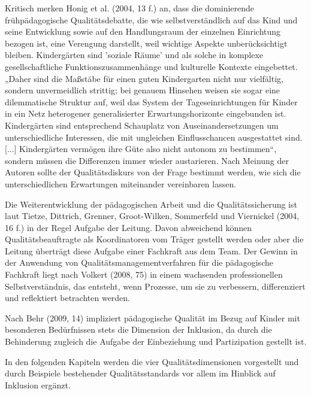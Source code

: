 Kritisch merken Honig et al. (2004, 13 f.) an, dass die dominierende frühpädagogische Qualitätsdebatte, die wie selbstverständlich auf das Kind und seine Entwicklung sowie auf den Handlungsraum der einzelnen Einrichtung bezogen ist, eine Verengung darstellt, weil wichtige Aspekte unberücksichtigt bleiben. Kindergärten sind 'soziale Räume' und als solche in komplexe gesellschaftliche Funktionszusammenhänge und kulturelle Kontexte eingebettet. „Daher sind die Maßstäbe für einen guten Kindergarten nicht nur vielfältig, sondern unvermeidlich strittig; bei genauem Hinsehen weisen sie sogar eine dilemmatische Struktur auf, weil das System der Tageseinrichtungen für Kinder in ein Netz heterogener generalisierter Erwartungshorizonte eingebunden ist. Kindergärten sind entsprechend Schauplatz von Auseinandersetzungen um unterschiedliche Interessen, die mit ungleichen Einflusschancen ausgestattet sind. [...] Kindergärten vermögen ihre Güte also nicht autonom zu bestimmen“, sondern müssen die Differenzen immer wieder austarieren. 
Nach Meinung der Autoren sollte der Qualitätsdiskurs von der Frage bestimmt werden, wie sich die unterschiedlichen Erwartungen miteinander vereinbaren lassen.

Die Weiterentwicklung der pädagogischen Arbeit und die Qualitätssicherung ist laut Tietze, Dittrich, Grenner, Groot-Wilken, Sommerfeld und Viernickel (2004, 16 f.) in der Regel Aufgabe der Leitung. Davon abweichend können Qualitätsbeauftragte als Koordinatoren vom Träger gestellt werden oder aber die Leitung überträgt diese Aufgabe einer Fachkraft aus dem Team. 
Der Gewinn in der Anwendung von Qualitätsmanagementverfahren für die pädagogische Fachkraft liegt nach Volkert (2008, 75) in einem  wachsenden professionellen Selbstverständnis, das entsteht, wenn Prozesse, um sie zu verbessern, differenziert und reflektiert betrachten werden.

Nach Behr (2009, 14) impliziert pädagogische Qualität im Bezug auf Kinder mit besonderen Bedürfnissen stets die Dimension der Inklusion, da durch die Behinderung zugleich die Aufgabe der Einbeziehung und Partizipation gestellt ist. 

In den folgenden Kapiteln werden die vier Qualitätsdimensionen vorgestellt und durch Beispiele bestehender Qualitätsstandards vor allem im Hinblick auf Inklusion ergänzt.

